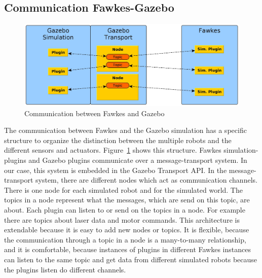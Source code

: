 \subsection{Communication Fawkes-Gazebo}
\begin{figure}
\includegraphics[width=\textwidth]{tabs/communication}
\caption{Communication between Fawkes and Gazebo}
\label{fig:communication}
\end{figure}
The communication between Fawkes and the Gazebo simulation has a specific structure to organize the distinction between the multiple robots and the different sensors and actuators. Figure~\ref{fig:communication} shows this structure. Fawkes simulation-plugins and Gazebo plugins communicate over a message-transport system. In our case, this system is embedded in the Gazebo Transport API. In the message-transport system, there are different nodes which act as communication channels. There is one node for each simulated robot and for the simulated world. The topics in a node represent what the messages, which are send on this topic, are about. Each plugin can listen to or send on the topics in a node. For example there are topics about laser data and motor commands. This architecture is extendable because it is easy to add new nodes or topics. It is flexible, because the communication through a topic in a node is a many-to-many relationship, and it is comfortable, because instances of plugins in different Fawkes instances can listen to the same topic and get data from different simulated robots because the plugins listen do different channels.


